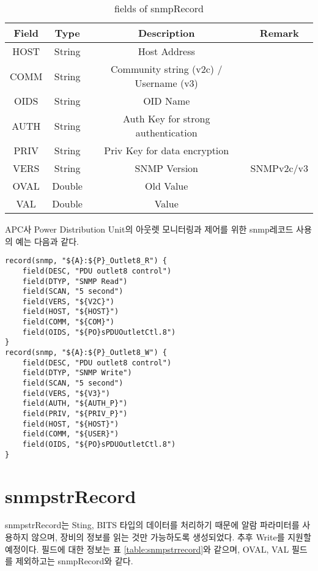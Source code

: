 \documentclass[11pt
  , a4paper
  , article
  , oneside
]{memoir}
\begin{document}
\begin{table}[!h]
\begin{center}
\begin{tabular}{cccc}\hline
Field & Type & Description & Remark\\ \hline
HOST & String & Host Address \\ \hline
COMM & String & Community string (v2c) / Username (v3) \\ \hline
OIDS & String & OID Name \\ \hline
AUTH & String & Auth Key for strong authentication \\ \hline
PRIV & String & Priv Key for data encryption\\ \hline
VERS & String & SNMP Version & SNMPv2c/v3	 \\ \hline
OVAL & Double & Old Value \\ \hline
VAL & Double & Value \\ \hline
\end{tabular}
\caption{fields of snmpRecord}
\label{table:snmprecord} 
\end{center}
\end{table} 

APC사 Power Distribution Unit의 아웃렛 모니터링과 제어를 위한 snmp레코드 사용의 예는 다음과 같다.

{\scriptsize
\begin{verbatim}
record(snmp, "${A}:${P}_Outlet8_R") {
    field(DESC, "PDU outlet8 control")
    field(DTYP, "SNMP Read")
    field(SCAN, "5 second")
    field(VERS, "${V2C}")
    field(HOST, "${HOST}")
    field(COMM, "${COM}")
    field(OIDS, "${PO}sPDUOutletCtl.8")
}
record(snmp, "${A}:${P}_Outlet8_W") {
    field(DESC, "PDU outlet8 control")
    field(DTYP, "SNMP Write")
    field(SCAN, "5 second")
    field(VERS, "${V3}")
    field(AUTH, "${AUTH_P}")
    field(PRIV, "${PRIV_P}")
    field(HOST, "${HOST}")
    field(COMM, "${USER}")
    field(OIDS, "${PO}sPDUOutletCtl.8")
}
\end{verbatim}
}

\section{snmpstrRecord}
snmpstrRecord는 Sting, BITS 타입의 데이터를 처리하기 때문에 알람 파라미터를 사용하지 않으며, 장비의 정보를 읽는 것만 가능하도록 생성되었다. 추후 Write를 지원할 예정이다. 필드에 대한 정보는 표 \ref{table:snmpstrrecord}와 같으며, OVAL, VAL 필드를 제외하고는 snmpRecord와 같다. 
\clearpage
\end{document}
